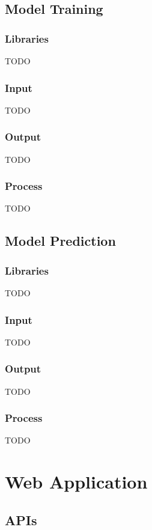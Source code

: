\documentclass{article}
\begin{document}
\subsection{Model Training}

\subsubsection*{Libraries}
TODO

\subsubsection*{Input}
TODO

\subsubsection*{Output}
TODO

\subsubsection*{Process}
TODO

\subsection{Model Prediction}

\subsubsection*{Libraries}
TODO

\subsubsection*{Input}
TODO

\subsubsection*{Output}
TODO

\subsubsection*{Process}
TODO

\newpage

\section{Web Application}

\subsection{APIs}
\end{document}
